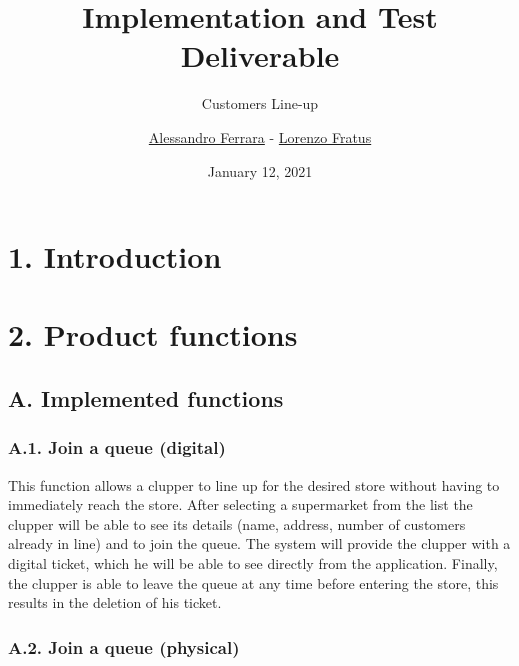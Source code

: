 
\graphicspath{ {assets/itd/} }
\usepackage{dirtree}

\title{Implementation and Test Deliverable}
\subtitle{Customers Line-up}
\author{\href{https://github.com/ferrohd}{Alessandro Ferrara} -
\href{https://github.com/lorenzofratus}{Lorenzo Fratus}}
\date{January 12, 2021}



\maketitle

\tableofcontents

\chapter{1. Introduction}

\chapter{2. Product functions}

\section{A. Implemented functions}

\subsection{A.1. Join a queue (digital)}

This function allows a clupper to line up for the desired store without having to immediately reach the store.
After selecting a supermarket from the list the clupper will be able to see its details (name, address, number of customers already in line) and to join the queue.
The system will provide the clupper with a digital ticket, which he will be able to see directly from the application.
Finally, the clupper is able to leave the queue at any time before entering the store, this results in the deletion of his ticket.

\subsection{A.2. Join a queue (physical)}

